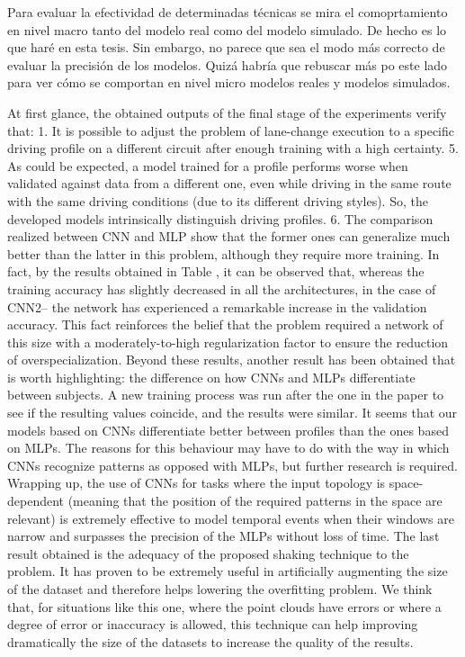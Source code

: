Para evaluar la efectividad de determinadas técnicas se mira el comoprtamiento en nivel macro tanto del modelo real como del modelo simulado. De hecho es lo que haré en esta tesis. Sin embargo, no parece que sea el modo más correcto de evaluar la precisión de los modelos. Quizá habría que rebuscar más po este lado para ver cómo se comportan en nivel micro modelos reales y modelos simulados.

At first glance, the obtained outputs of the final stage of the experiments verify that:
1. It is possible to adjust the problem of lane-change execution to a specific driving profile on a different circuit after enough training with a high certainty.
5. As could be expected, a model trained for a profile performs worse when validated against data from a different one, even while driving in the same route with the same driving conditions (due to its different driving styles). So, the developed models intrinsically distinguish driving profiles.
6. The comparison realized between CNN and MLP show that the former ones can generalize much better than the latter in this problem, although they require more training. In fact, by the results obtained in Table , it can be observed that, whereas the training accuracy has slightly decreased in all the architectures, in the case of CNN2-- the network has experienced a remarkable increase in the validation accuracy. This fact reinforces the belief that the problem required a network of this size with a moderately-to-high regularization factor to ensure the reduction of overspecialization.
Beyond these results, another result has been obtained that is worth highlighting: the difference on how CNNs and MLPs differentiate between subjects. A new training process was run after the one in the paper to see if the resulting values coincide, and the results were similar. It seems that our models based on CNNs differentiate better between profiles than the ones based on MLPs. The reasons for this behaviour may have to do with the way in which CNNs recognize patterns as opposed with MLPs, but further research is required.
Wrapping up, the use of CNNs for tasks where the input topology is space-dependent (meaning that the position of the required patterns in the space are relevant) is extremely effective to model temporal events when their windows are narrow and surpasses the precision of the MLPs without loss of time.
The last result obtained is the adequacy of the proposed shaking technique to the problem. It has proven to be extremely useful in artificially augmenting the size of the dataset and therefore helps lowering the overfitting problem. We think that, for situations like this one, where the point clouds have errors or where a degree of error or inaccuracy is allowed, this technique can help improving dramatically the size of the datasets to increase the quality of the results.
